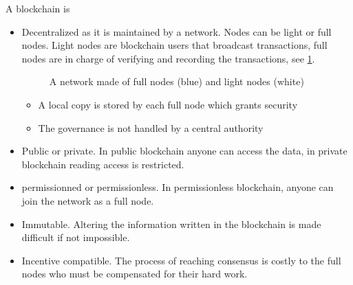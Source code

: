 \noindent A blockchain is 
\begin{itemize}
	\item Decentralized as it is maintained by a network. Nodes can be light or full nodes. Light nodes are blockchain users that broadcast transactions, full nodes are in charge of verifying and recording the transactions, see \cref{fig:blockchain_network}.
	\begin{figure}[ht!]
\begin{center}
\end{center}
\caption{A network made of full nodes (blue) and light nodes (white)}
\label{fig:blockchain_network}
\end{figure}

	\begin{itemize}
		\item A local copy is stored by each full node which grants security
		\item The governance is not handled by a central authority
	\end{itemize}
	\item Public or private. In public blockchain anyone can access the data, in private blockchain reading access is restricted.
	\item permissionned or permissionless. In permissionless blockchain, anyone can join the network as a full node.
	\item Immutable. Altering the information written in the blockchain is made difficult if not impossible.
	\item Incentive compatible. The process of reaching consensus is costly to the full nodes who must be compensated for their hard work.
\end{itemize}
